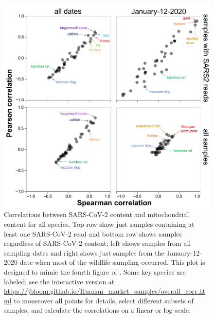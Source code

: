 \documentclass[9pt,twocolumn,twoside]{gsajnl_modified}
\begin{document}
\begin{figure}
\includegraphics[width=\linewidth]{figures/overall_corr/overall_corr.pdf}
\caption{
Correlations between SARS-CoV-2 content and mitochondrial content for all species.
Top row show just samples containing at least one SARS-CoV-2 read and bottom row shows samples regardless of SARS-CoV-2 content; left shows samples from all sampling dates and right shows just samples from the January-12-2020 date when most of the wildlife sampling occurred.
This plot is designed to mimic the fourth figure of \citet{liu2022surveillance}.
Some key species are labeled; see the interactive version at \url{https://jbloom.github.io/Huanan_market_samples/overall_corr.html} to mouseover all points for details, select different subsets of samples, and calculate the correlations on a linear or log scale.
\label{fig:overall_corr}
}
\end{figure}
\end{document}
